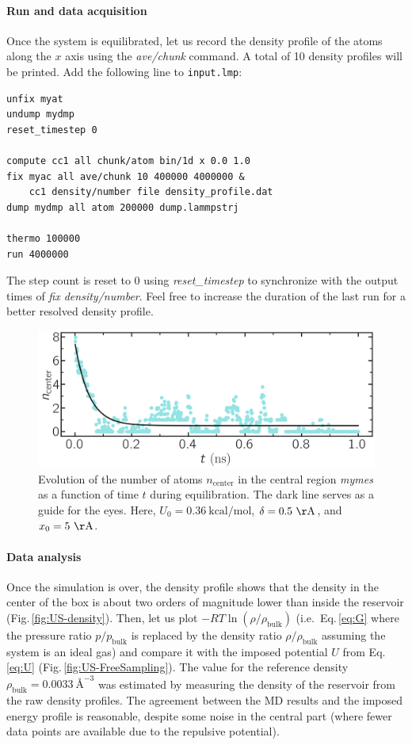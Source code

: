 \documentclass[9pt,tutorial]{livecoms}
\newcommand{\flecmd}[1]{\textcolor{command}{\texttt{#1}}} %
\begin{document}
\paragraph{Run and data acquisition}
Once the system is equilibrated, let us record the density profile of
the atoms along the $x$ axis using
the \textit{ave/chunk} command. A total of 10 density profiles will be printed.
Add the following line to \flecmd{input.lmp}:
\begin{lstlisting}
unfix myat
undump mydmp
reset_timestep 0

compute cc1 all chunk/atom bin/1d x 0.0 1.0
fix myac all ave/chunk 10 400000 4000000 &
    cc1 density/number file density_profile.dat
dump mydmp all atom 200000 dump.lammpstrj

thermo 100000
run 4000000
\end{lstlisting}
The step count is reset to 0 using \textit{reset\_timestep} to synchronize
with the output times of \textit{fix density/number}. Feel free to increase the
duration of the last run for a better resolved density profile.

\begin{figure}
\centering
\includegraphics[width=\linewidth]{US-density-evolution}
\caption{Evolution of the number of atoms $n_\text{center}$ in the central
region \textit{mymes} as a function of time $t$ during equilibration. The dark line
serves as a guide for the eyes. Here, $U_0 = 0.36~\text{kcal/mol}$,
$\delta = 0.5~\mathrm{\AA{}}$, and $x_0 = 5~\mathrm{\AA{}}$.}
\label{fig:US-density-evolution}
\end{figure}

\paragraph{Data analysis}

Once the simulation is over, the density profile shows that the density in the center of the box is
about two orders of magnitude lower than inside the reservoir (Fig.\,\ref{fig:US-density}).
Then, let us plot $-R T \ln(\rho/\rho_\mathrm{bulk})$ (i.e.~Eq.\,\eqref{eq:G} where
the pressure ratio $p/p_\mathrm{bulk}$ is replaced by the density ratio
$\rho/\rho_\mathrm{bulk}$ assuming the system is an ideal gas) and compare it
with the imposed potential $U$ from Eq.\,\eqref{eq:U} (Fig.\,\ref{fig:US-FreeSampling}).
The value for the reference density $\rho_\text{bulk} = 0.0033~\text{\AA{}}^{-3}$
was estimated by measuring the density of the reservoir from the raw density
profiles. The agreement between the MD results and the imposed energy profile
is reasonable, despite some noise in the central part (where fewer data points
are available due to the repulsive potential).
\end{document}
